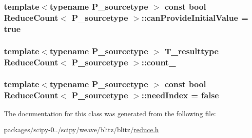 \subsubsection[{can\+Provide\+Initial\+Value}]{\setlength{\rightskip}{0pt plus 5cm}template$<$typename P\+\_\+sourcetype $>$ const {\bf bool} {\bf Reduce\+Count}$<$ P\+\_\+sourcetype $>$\+::can\+Provide\+Initial\+Value = {\bf true}\hspace{0.3cm}{\ttfamily [static]}}\label{classReduceCount_ae813167cbdc36397f1488fd05ad5840d}
\hypertarget{classReduceCount_ac07a02efbce10910a7ab991b681de1e1}{}
\subsubsection[{count\+\_\+}]{\setlength{\rightskip}{0pt plus 5cm}template$<$typename P\+\_\+sourcetype $>$ {\bf T\+\_\+resulttype} {\bf Reduce\+Count}$<$ P\+\_\+sourcetype $>$\+::count\+\_\+\hspace{0.3cm}{\ttfamily [protected]}}\label{classReduceCount_ac07a02efbce10910a7ab991b681de1e1}
\hypertarget{classReduceCount_a21a0b77e29742867419fa7001472b5be}{}
\subsubsection[{need\+Index}]{\setlength{\rightskip}{0pt plus 5cm}template$<$typename P\+\_\+sourcetype $>$ const {\bf bool} {\bf Reduce\+Count}$<$ P\+\_\+sourcetype $>$\+::need\+Index = {\bf false}\hspace{0.3cm}{\ttfamily [static]}}\label{classReduceCount_a21a0b77e29742867419fa7001472b5be}


The documentation for this class was generated from the following file\+:\begin{DoxyCompactItemize}
\item 
packages/scipy-\/0../scipy/weave/blitz/blitz/\hyperlink{reduce_8h}{reduce.\+h}\end{DoxyCompactItemize}
